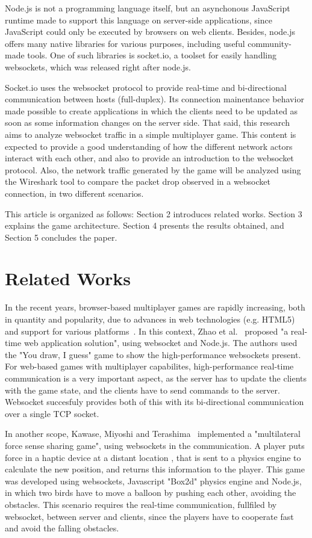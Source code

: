 \documentclass[english]{sbrt}
\begin{document}
Node.js is not a programming language itself, but an asynchonous JavaScript runtime made to support this language on server-side applications, since JavaScript could
only be executed by browsers on web clients. Besides, node.js offers many native libraries for various purposes, including useful community-made tools. One of such libraries is socket.io, a toolset for easily handling websockets, which was released right after node.js.

Socket.io uses the websocket protocol to provide real-time and bi-directional communication between hosts (full-duplex). Its connection mainentance behavior made possible to create applications in which the clients need to be updated as soon as some information changes on the server side. That said, this research aims to analyze websocket traffic in a simple multiplayer game. This content is expected to provide a good understanding of how the different network
actors interact with each other, and also to provide an introduction to the websocket protocol. Also, the network traffic generated by the game will be analyzed
using the Wireshark tool to compare the packet drop observed in a websocket connection, in two different scenarios.

This article is organized as follows: Section 2 introduces related works. Section 3 explains the game architecture. Section 4 presents the results obtained, and Section 5 concludes the paper.

\section{\textbf{Related Works}}

In the recent years, browser-based multiplayer games are rapidly increasing, both in quantity and popularity, due to advances in web technologies (e.g. HTML5) and support for various platforms~\cite{chen2011framework}. In this context, Zhao et al.~\cite{zhao2013real} proposed "a real-time web application solution", using websocket and Node.js. The authors used the "You draw, I guess" game to show the high-performance websockets present. For web-based games with multiplayer capabilites, high-performance real-time communication is a very important aspect, as the server has to update the clients with the game state, and the clients have to send commands to the server. Websocket succesfuly provides both of this with its bi-directional communication over a single TCP socket.

In another scope, Kawase, Miyoshi and Terashima~\cite{kawase2015development} implemented a "multilateral force sense sharing game", using websockets in the communication. A player puts force in a haptic device at a distant location , that is sent to a physics engine to calculate the new position, and returns this information to the player. This game was developed using websockets, Javascript "Box2d" physics engine and Node.js, in which two birds have to move a balloon by pushing each other, avoiding the obstacles. This scenario requires the real-time communication, fullfiled by websocket, between server and clients, since the players have to cooperate fast and avoid the falling obstacles.
\end{document}
